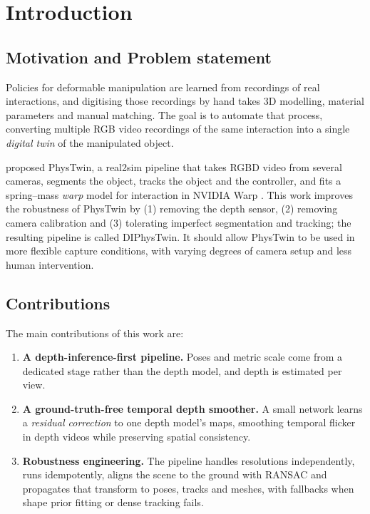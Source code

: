 \chapter{Introduction}
\label{cha:introduction}

\section{Motivation and Problem statement}
\label{sec:intro-problem}

Policies for deformable manipulation are learned from recordings of real interactions, and
digitising those recordings by hand takes 3D modelling, material parameters and manual matching. The goal is to automate that process, converting multiple RGB video recordings of the same interaction into a single \emph{digital twin} of the manipulated object.

\textcite{phystwin} proposed PhysTwin, a real2sim pipeline that takes RGBD video from several
cameras, segments the object, tracks the object and the controller, and fits a spring--mass
\emph{warp} model for interaction in NVIDIA Warp \parencite{warp}. This work improves the robustness of PhysTwin by (1) removing the depth sensor, (2) removing camera calibration and (3) tolerating imperfect segmentation and tracking; the resulting pipeline is called DIPhysTwin. It should allow PhysTwin to be used in more flexible capture conditions, with varying degrees of camera setup and less human intervention.

\section{Contributions}
\label{sec:intro-contributions}

The main contributions of this work are:

\begin{enumerate}
	\item \textbf{A depth-inference-first pipeline.} Poses and metric scale come from a dedicated
	stage rather than the depth model, and depth is estimated per view.
	\item \textbf{A ground-truth-free temporal depth smoother.} A small network learns a
	\emph{residual correction} to one depth model's maps, smoothing temporal flicker in depth videos while preserving spatial consistency.
	\item \textbf{Robustness engineering.} The pipeline handles resolutions independently, runs
	idempotently, aligns the scene to the ground with RANSAC and propagates that transform to poses,
	tracks and meshes, with fallbacks when shape prior fitting or dense tracking fails.
\end{enumerate}


